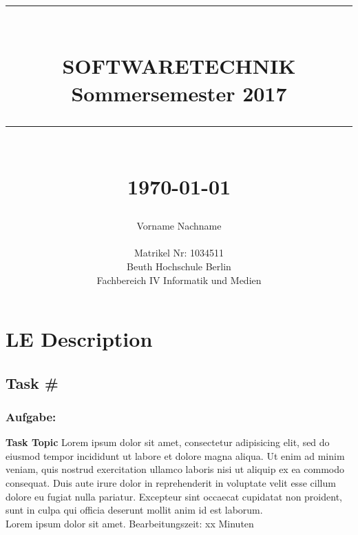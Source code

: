 \documentclass[12pt]{article}
\newcommand{\HRule}[1]{\rule{\linewidth}{#1}}
\begin{document}
\title{ \normalsize
		\HRule{0.5pt} \\
		\LARGE \textbf{\uppercase{Softwaretechnik}} \\
    \smallbreak
		\small\textbf{{Sommersemester 2017}}\\
		\HRule{2pt} \\ [0.5cm]
		\normalsize \today \vspace*{10\baselineskip}}

\date{}

\author{
		Vorname Nachname \\
    \\
		Matrikel Nr: 1034511 \\
		Beuth Hochschule Berlin \\
		Fachbereich IV Informatik und Medien }
\maketitle
\newpage
{}


\sectionfont{\scshape}


\section{LE Description}

\subsection{Task \#}
\subsubsection*{Aufgabe:}

\begin{framed}
\textbf{Task Topic}
\smallbreak
Lorem ipsum dolor sit amet, consectetur adipisicing elit, sed do eiusmod tempor incididunt ut labore et dolore magna aliqua. Ut enim ad minim veniam, quis nostrud exercitation ullamco laboris nisi ut aliquip ex ea commodo consequat. Duis aute irure dolor in reprehenderit in voluptate velit esse cillum dolore eu fugiat nulla pariatur. Excepteur sint occaecat cupidatat non proident, sunt in culpa qui officia deserunt mollit anim id est laborum.
\\
Lorem ipsum dolor sit amet.
\bigbreak
\small Bearbeitungszeit: xx Minuten
\end{framed}
\bigbreak
\bigbreak
\end{document}

